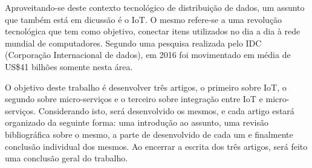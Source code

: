 Aproveitando-se deste contexto tecnológico de distribuição de dados, um assunto que também está em dicussão é o IoT. O mesmo refere-se a uma revolução tecnológica que tem como objetivo, conectar itens utilizados no dia a dia à rede mundial de computadores. Segundo uma pesquisa realizada pelo IDC (Corporação Internacional de dados), em 2016 foi movimentado em média de US\$41 bilhões somente nesta área.

O objetivo deste trabalho é desenvolver três artigos, o primeiro sobre IoT, o segundo sobre micro-serviços e o terceiro sobre integração entre IoT e micro-serviços. Considerando isto, será desenvolvido os mesmos, e cada artigo estará organizado da seguinte forma: uma introdução ao assunto, uma revisão bibliográfica sobre o mesmo, a parte de desenvolvido de cada um e finalmente conclusão individual dos mesmos. Ao encerrar a escrita dos três artigos, será feito uma conclusão geral do trabalho.


